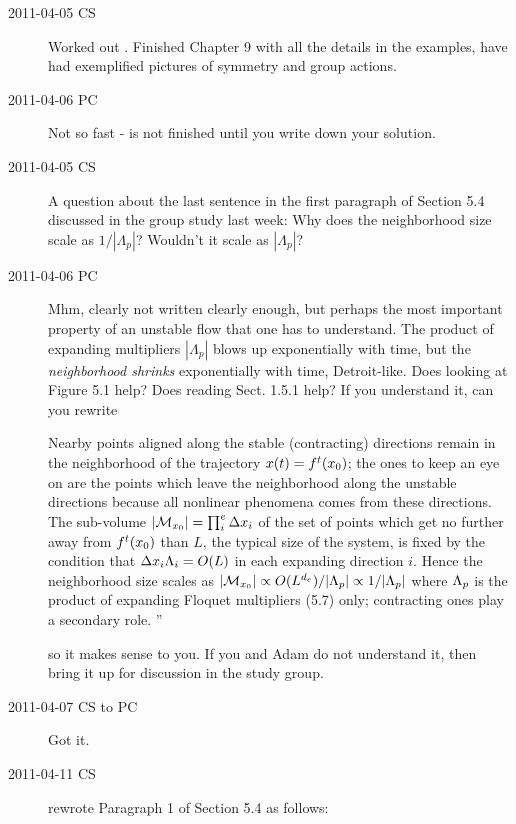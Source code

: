 \begin{description}
\item[2011-04-05 CS] Worked out . Finished Chapter 9
with all the details in the examples, have had exemplified pictures of
symmetry and group actions.

\item[2011-04-06 PC] Not so fast -  is not finished
until you write down your solution.

\item[2011-04-05 CS]
    A question about the last sentence in the first paragraph of Section
    5.4  discussed in the group study last week: Why does the
    neighborhood size scale as $1/|\Lambda_{p}|$? Wouldn't it scale as
    $|\Lambda_{p}|$?

\item[2011-04-06 PC] Mhm, clearly not written clearly enough, but
perhaps the most important property of an unstable flow
that one has to understand. The product of expanding multipliers
$|\Lambda_{p}|$ blows up exponentially with time, but the
\emph{neighborhood shrinks} exponentially with time, Detroit-like.
 Does looking
at Figure 5.1 help? Does reading Sect. 1.5.1 help? If you understand it,
can you rewrite

                                                    \toCB
Nearby points aligned along the stable
(contracting) directions  remain in the neighborhood of the
trajectory $x(t)= {f^{t}({x_0})}$; the ones to keep an eye
on are the points which leave the neighborhood along the
unstable directions because all nonlinear phenomena comes
from these directions. The sub-volume $ |{\cal M}_{{x_0}}| = \prod_i^e\Delta
x_i$ of the set of points which get no further away from
${f^{t}({x_0})}$ than $L$, the typical size of the system, is
fixed by the condition that $\Delta x_i \Lambda_i = O(L)$
in each expanding direction $i$. Hence the neighborhood size
scales as
$|{\cal M}_{{x_0}}| \propto O(L^{d_e})/|\Lambda_p| \propto 1/|\Lambda_p| $
where $\Lambda_p$ is the
product of expanding Floquet multipliers
(5.7) %
only;
contracting ones play a secondary role.
''

so it makes sense to you. If you and Adam do not understand it, then
bring it up for discussion in the study group.

\item[2011-04-07 CS to PC] Got it.

\item[2011-04-11 CS]
rewrote Paragraph 1 of Section 5.4 as follows:


\end{description}
